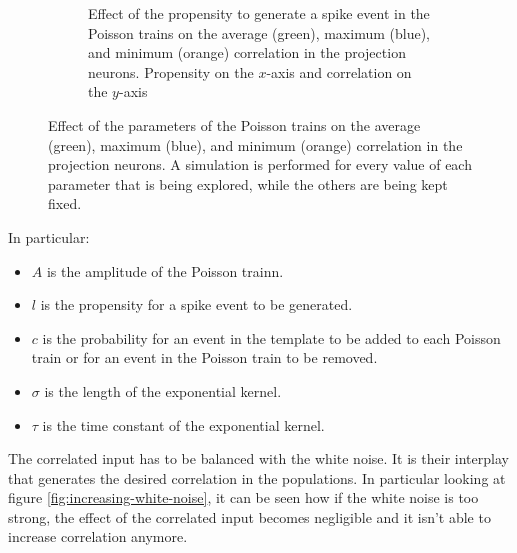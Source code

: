 \begin{figure}
\begin{subfigure}[t]{\textwidth}
        \caption{Effect of the propensity to generate a spike event in the Poisson trains on the average (green), maximum (blue), and minimum (orange) correlation in the projection neurons. Propensity on the $x$-axis and correlation on the $y$-axis}
        \label{fig:finding-poisson-train-l}
      \end{subfigure}
      \caption{Effect of the parameters of the Poisson trains on the average (green), maximum (blue), and minimum (orange) correlation in the projection neurons. A simulation is performed for every value of each parameter that is being explored, while the others are being kept fixed.}
      \label{fig:finding-poisson-train}
    \end{figure}

    In particular:

    \begin{itemize}
      \item $A$ is the amplitude of the Poisson trainn.
      \item $l$ is the propensity for a spike event to be generated.
      \item $c$ is the probability for an event in the template to be added to each Poisson train or for an event in the Poisson train to be removed.
      \item $\sigma$ is the length of the exponential kernel.
      \item $\tau$ is the time constant of the exponential kernel.
    \end{itemize}

    The correlated input has to be balanced with the white noise.
    It is their interplay that generates the desired correlation in the populations.
    In particular looking at figure \ref{fig:increasing-white-noise}, it can be seen how if the white noise is too strong, the effect of the correlated input becomes negligible and it isn't able to increase correlation anymore.

